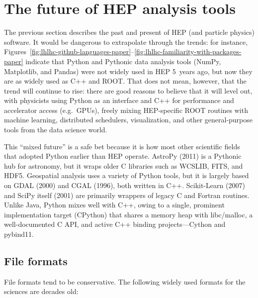 \documentclass[12pt,a4paper]{article}
\begin{document}
\section{The future of HEP analysis tools}

The previous section describes the past and present of HEP (and particle physics) software. It would be dangerous to extrapolate through the trends: for instance, Figures~\ref{fig:lhlhc-github-languages-paper}--\ref{fig:lhlhc-familiarity-with-packages-paper} indicate that Python and Pythonic data analysis tools (NumPy, Matplotlib, and Pandas) were not widely used in HEP 5~years ago, but now they are as widely used as C++ and ROOT. That does not mean, however, that the trend will continue to rise: there are good reasons to believe that it will level out, with physicists using Python as an interface and C++ for performance and accelerator access (e.g.\ GPUs), freely mixing HEP-specific ROOT routines with machine learning, distributed schedulers, visualization, and other general-purpose tools from the data science world.

This ``mixed future'' is a safe bet because it is how most other scientific fields that adopted Python earlier than HEP operate. AstroPy (2011) is a Pythonic hub for astronomy, but it wraps older C libraries such as WCSLIB, FITS, and HDF5. Geospatial analysis uses a variety of Python tools, but it is largely based on GDAL (2000) and CGAL (1996), both written in C++. Scikit-Learn (2007) and SciPy itself (2001) are primarily wrappers of legacy C and Fortran routines. Unlike Java, Python mixes well with C++, owing to a single, prominent implementation target (CPython) that shares a memory heap with libc/malloc, a well-documented C API, and active C++ binding projects---Cython and pybind11.

\subsection{File formats}

File formats tend to be conservative. The following widely used formats for the sciences are decades old:
\end{document}
